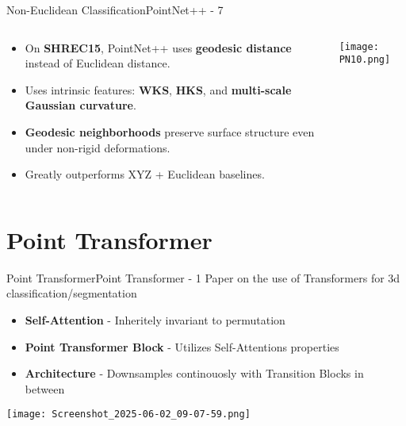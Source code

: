 \documentclass{beamer}
\begin{document}
\begin{frame}{Non-Euclidean Classification}{PointNet++ - 7}
\begin{columns}[T]

\begin{column}{0.55\textwidth}
\small
\begin{itemize}
    \item On \textbf{SHREC15}, PointNet++ uses \textbf{geodesic distance} instead of Euclidean distance.
    \item Uses intrinsic features: \textbf{WKS}, \textbf{HKS}, and \textbf{multi-scale Gaussian curvature}.
    \item \textbf{Geodesic neighborhoods} preserve surface structure even under non-rigid deformations.
    \item Greatly outperforms XYZ + Euclidean baselines.
\end{itemize}
\end{column}

\begin{column}{0.45\textwidth}
    \centering
    \texttt{[image: PN10.png]}
\end{column}

\end{columns}
\end{frame}

    

	\section{Point Transformer}
		\begin{frame}{Point Transformer}{Point Transformer - 1}
			Paper on the use of Transformers for 3d classification/segmentation
			\begin{itemize}
				\item \textbf{Self-Attention} - Inheritely invariant to permutation
                \item \textbf{Point Transformer Block} - Utilizes Self-Attentions properties
                \item \textbf{Architecture} - Downsamples continouosly with Transition Blocks in between
			\end{itemize}
            \begin{center}
                \texttt{[image: Screenshot\_2025-06-02\_09-07-59.png]}
            \end{center}
		\end{frame}
		
\end{document}
